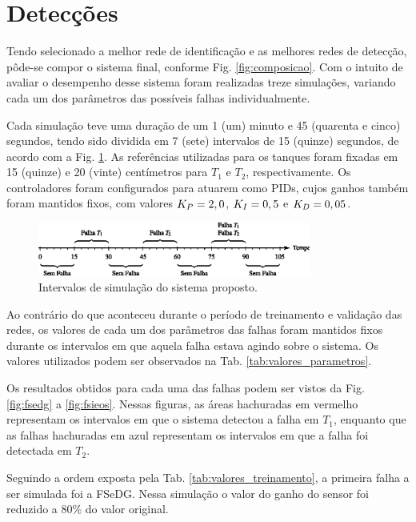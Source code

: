 \section{Detecções}
Tendo selecionado a melhor rede de identificação e as melhores redes de
detecção, pôde-se compor o sistema final, conforme Fig. \ref{fig:composicao}.
Com o intuito de avaliar o desempenho desse sistema foram realizadas treze
simulações, variando cada um dos parâmetros das possíveis falhas
individualmente.

Cada simulação teve uma duração de um 1 (um) minuto e 45 (quarenta e cinco)
segundos, tendo sido dividida em 7 (sete) intervalos de 15 (quinze) segundos, de
acordo com a Fig. \ref{fig:intervalos}. As referências utilizadas para os
tanques foram fixadas em 15 (quinze) e 20 (vinte) centímetros para $T_1$ e
$T_2$, respectivamente. Os controladores foram configurados para atuarem como
PIDs, cujos ganhos também foram mantidos fixos, com valores $K_{\tiny P} = 2,0$,
$K_{\tiny I} = 0,5$ e $K_{\tiny D} = 0,05$.

\begin{figure}[htb]
\centering
    \includegraphics[width=0.8\textwidth]{imgs/resultados/eps/intervalos}
    \caption{Intervalos de simulação do sistema proposto.}
    \label{fig:intervalos}
\end{figure}

Ao contrário do que aconteceu durante o período de treinamento e validação das
redes, os valores de cada um dos parâmetros das falhas foram mantidos fixos
durante os intervalos em que aquela falha estava agindo sobre o sistema. Os
valores utilizados podem ser observados na Tab. \ref{tab:valores_parametros}.

Os resultados obtidos para cada uma das falhas podem ser vistos da Fig.
\ref{fig:fsedg} a \ref{fig:fsieos}. Nessas figuras, as áreas hachuradas em
vermelho representam os intervalos em que o sistema detectou a falha em $T_1$,
enquanto que as falhas hachuradas em azul representam os intervalos em que a
falha foi detectada em $T_2$.

Seguindo a ordem exposta pela Tab. \ref{tab:valores_treinamento}, a primeira
falha a ser simulada foi a FSeDG. Nessa simulação o valor do ganho do sensor foi
reduzido a 80\% do valor original.

